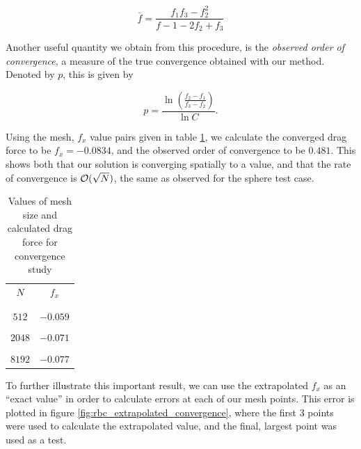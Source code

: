 \begin{equation}
	\bar{f} = \frac{f_1f_3-f_2^{2}}{f-1 -2f_2+f_3}
\end{equation}

Another useful quantity we obtain from this procedure, is the \emph{observed order of convergence}, a measure of the true convergence obtained with our method. Denoted by $p$, this is given by

\begin{equation}
	p = \frac{\ln{\left(\frac{f_2-f_1}{f_3-f_2}\right)}}{\ln{C}}.
\end{equation}

Using the mesh, $f_x$ value pairs given in table \ref{tab:rbc_richardson_values}, we calculate the converged drag force to be $f_x = -0.0834$, and the observed order of convergence to be $0.481$. This shows both that our solution is converging spatially to a value, and that the rate of convergence is $\mathcal{O}(\sqrt{N})$, the same as observed for the sphere test case.

\begin{table}[htdp]
\begin{center}
\begin{tabular}{c|c}
	$N$ & $f_x$ \\
	& \\\hline
	& \\
	$512$ & $-0.059$ \\
	& \\
	$2048$ & $-0.071$ \\ 
	& \\
	$8192$ & $-0.077$ \\
\end{tabular}
\end{center}
\caption{Values of mesh size and calculated drag force for convergence study}
\label{tab:rbc_richardson_values}
\end{table}%

To further illustrate this important result, we can use the extrapolated $f_x$ as an ``exact value'' in order to calculate errors at each of our mesh points. This error is plotted in figure \ref{fig:rbc_extrapolated_convergence}, where the first 3 points were used to calculate the extrapolated value, and the final, largest point was used as a test.

